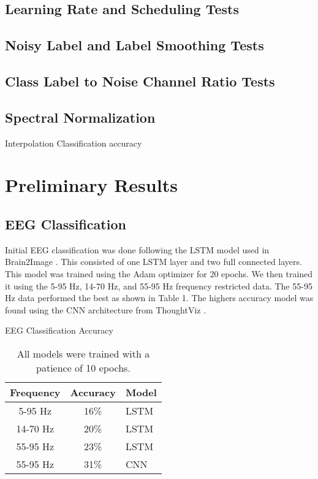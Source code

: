 \documentclass[sigplan,screen]{acmart}
\begin{document}
\subsection{Learning Rate and Scheduling Tests}
\subsection{Noisy Label and Label Smoothing Tests}
\subsection{Class Label to Noise Channel Ratio Tests}
\subsection{Spectral Normalization}

Interpolation
Classification accuracy







\section{Preliminary Results}
\subsection{EEG Classification}
Initial EEG classification was done following the LSTM model used in Brain2Image \cite{10.1145/3240508.3240641}. This consisted of one LSTM layer and two full connected layers. This model was trained using the Adam optimizer for 20 epochs. We then trained it using the 5-95 Hz, 14-70 Hz, and 55-95 Hz frequency restricted data. The 55-95 Hz data performed the best as shown in Table 1. The highers accuracy model was found using the CNN architecture from ThoughtViz \cite{spampinato2019deep}.

\begin{table}
  \label{tab:freq}
  \caption{EEG Classification Accuracy}
  \caption*{\footnotesize All models were trained with a patience of 10 epochs.}
  \begin{tabular}{ccl}
    \toprule
    Frequency&Accuracy&Model\\
    \midrule
    5-95 Hz & 16\% & LSTM\\
    14-70 Hz & 20\% & LSTM\\
    55-95 Hz & 23\% & LSTM\\
    55-95 Hz & 31\% & CNN\\
  \bottomrule
\end{tabular}
\end{table}
\end{document}
